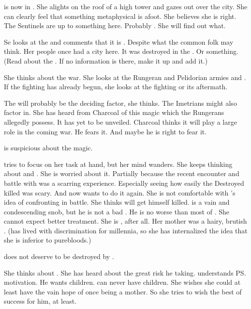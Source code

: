 % 
\Achsah is now in \Forklin. 
She alights on the roof of a high tower and gazes out over the city. 
She can clearly feel that something metaphysical is afoot. 
She believes she is right. 
The Sentinels are up to something here. 
Probably \Secherdamon. 
She will find out what. 

Se looks at the  and comments that it is . 
Despite what the common folk may think. 
Her people once had a city here.
It was destroyed in the \resphanwars. 
Or something. 
(Read about the . 
 If no information is there, make it up and add it.)

She thinks about the war.
She looks at the Rungeran and Pelidorian armies and \ishroth. 
If the fighting has already begun, she looks at the fighting or its aftermath.

The \ishroth will probably be the deciding factor, she thinks.
The Imetrians might also factor in. 
She has heard from Charcoal of this \quo{\EreshKali} magic which the Rungerans allegedly possess. 
It has yet to be unveiled. 
Charcoal thinks it will play a large role in the coming war. 
He fears it.
And maybe he is right to fear it.

\Achsah is suspicious about the \EreshKali magic. 

\Achsah tries to focus on her task at hand, but her mind wanders.
She keeps thinking about \Teshrial and \Ishnaruchaefir. 
She is worried about it. 
Partially because the recent encounter and battle with \Ishnaruchaefir was a scarring experience. 
Especially seeing how easily the Destroyed killed \Teshrial was scary.
And now \Teshrial wants to do it again.
She is not comfortable with \Teshrial's idea of confronting \Ishnaruchaefir in battle. 
She thinks \Teshrial will get himself killed. 
\Teshrial is a vain and condescending snob, but he is not a bad \resphan.
He is no worse than most of \CiriathSepher. 
She cannot expect better treatment. 
She is \ashenblooded, after all. 
Her mother was a hairy, brutish \nephil. 
(\Achsah has lived with discrimination for millennia, so she has internalized the idea that she is inferior to purebloods.)

\Teshrial does not deserve to be destroyed by \Ishnaruchaefir. 

She thinks about \Teshrial.
She has heard about the great risk he taking. 
\Achsah{} understands \ps{\Teshrial} motivation. 
He wants children. 
\Achsah{} can never have children. 
She wishes she could at least have the vain hope of once being a mother. 
So she tries to wish the best of success for him, at least. 

